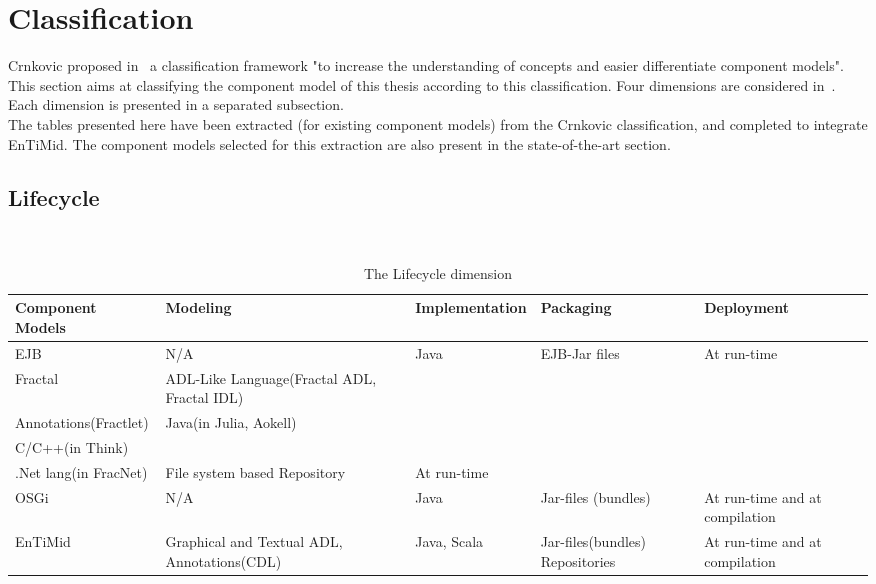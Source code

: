 \section{Classification}

Crnkovic proposed in~\cite{Crnkovic_1374:2007} a classification framework "to increase the understanding of concepts and easier differentiate component models". This section aims at classifying the component model of this thesis according to this classification. Four dimensions are considered in~\cite{Crnkovic_1374:2007}. Each dimension is presented in a separated subsection.\\
The tables presented here have been extracted (for existing component models) from the Crnkovic classification, and completed to integrate EnTiMid. The component models selected for this extraction are also present in the state-of-the-art section.

\subsection{Lifecycle}
~\vspace{-0,5cm}
\begin{table}[h!]
\centering
{\scriptsize 
\begin{tabular}{|>{\centering}m{}||>{\centering}m{}|>{\centering}m{}|>{\centering}m{}|>{\centering\arraybackslash}m{}|}
\hline
Component Models & Modeling & Implementation & Packaging & Deployment \\
\hline
EJB & N/A & Java & EJB-Jar files & At run-time \\
\hline
Fractal & ADL-Like Language(Fractal ADL, Fractal IDL)\\ Annotations(Fractlet) & Java(in Julia, Aokell)\\ C/C++(in Think)\\ .Net lang(in FracNet) & File system based Repository & At run-time \\
\hline
OSGi & N/A & Java & Jar-files (bundles) & At run-time and at compilation \\
\hline\hline
EnTiMid & Graphical and Textual ADL, Annotations(CDL) & Java, Scala & Jar-files(bundles) Repositories & At run-time and at compilation \\
\hline
\end{tabular}
}
\caption{The Lifecycle dimension}
\label{tabl:classifLifeycle}
\end{table}
\vspace{-0,2cm}


